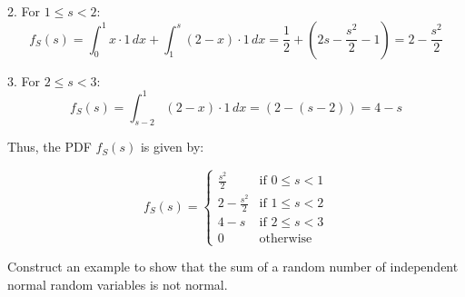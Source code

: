 \begin{solution}
2. For \(1 \leq s < 2\):
\[
f_S(s) = \int_{0}^{1} x \cdot 1 \, dx + \int_{1}^{s} (2 - x) \cdot 1 \, dx = \frac{1}{2} + (2s - \frac{s^2}{2} - 1) = 2 - \frac{s^2}{2}
\]

3. For \(2 \leq s < 3\):
\[
f_S(s) = \int_{s-2}^{1} (2 - x) \cdot 1 \, dx = (2 - (s - 2)) = 4 - s
\]

Thus, the PDF \(f_S(s)\) is given by:

\[
f_S(s) = 
\begin{cases} 
\frac{s^2}{2} & \text{if } 0 \leq s < 1 \\ 
2 - \frac{s^2}{2} & \text{if } 1 \leq s < 2 \\ 
4 - s & \text{if } 2 \leq s < 3 \\ 
0 & \text{otherwise} 
\end{cases}
\]

\end{solution}


\begin{exercise}
Construct an example to show that the sum of a random number of independent normal random variables is not normal.
\end{exercise}

